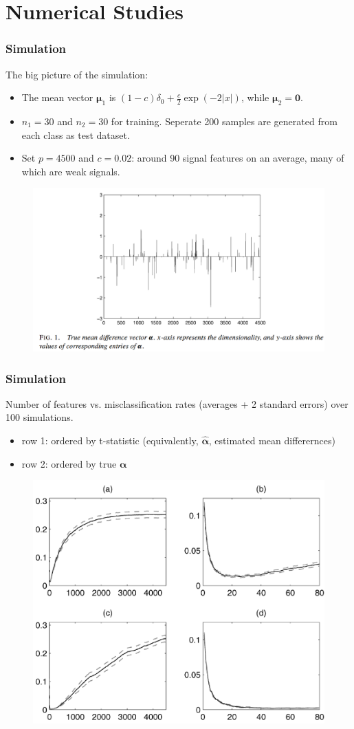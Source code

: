 \documentclass{beamer}
\begin{document}
	\section{Numerical Studies}
	\begin{frame}
		\frametitle{Simulation}
		The big picture of the simulation:
		\begin{itemize}
			\item 
			The mean vector $\bm{\mu}_1$ is $(1-c)\delta_0 + \frac{c}{2}\exp(-2|x|)$, while $\bm{\mu}_2 = \bm{0}$.
			\item
			$n_1 = 30$ and $n_2 = 30$ for training. Seperate 200 samples are generated from each class as test dataset.
			\item
			Set $p = 4500$ and $c = 0.02$: around 90 signal features on an average, many of which are weak signals.
		\end{itemize}
	\begin{figure}
		\includegraphics[width=.7\linewidth]{image013.png}
	\end{figure}
	\end{frame}
	
	\begin{frame}
		\frametitle{Simulation}
		Number of features vs. misclassification rates (averages + 2 standard errors) over 100 simulations.
		\begin{itemize}
			\item
			row 1: ordered by t-statistic (equivalently, $\hat{\bm{\alpha}}$, estimated mean differernces) 
			\item
			row 2: ordered by true $\bm{\alpha}$ 
		\end{itemize}
		\begin{figure}
			\includegraphics[width=.5\linewidth]{image014.png}
		\end{figure}
	\end{frame}
	
\end{document}

